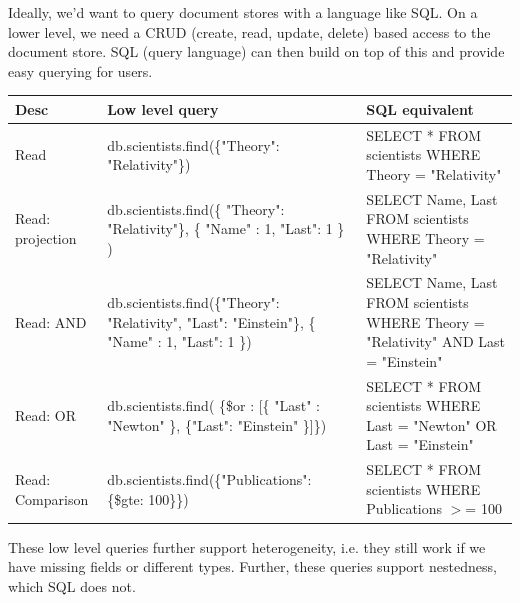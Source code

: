 \documentclass[11pt,oneside,a4paper]{article}
\begin{document}
Ideally, we'd want to query document stores with a language like SQL. On a lower level, we need a CRUD (create, read, update, delete) based access to the document store. SQL (query language) can then build on top of this and provide easy querying for users.\\

\begin{table}[hb!]
\centering
\begin{tabular}{|p{20mm}|p{75mm}|p{75mm}|}
	\hline 
	Desc & Low level query & SQL equivalent\\ 
	\hline 
	Read & db.scientists.find(\{"Theory": "Relativity"\}) & SELECT * FROM scientists
	WHERE Theory = "Relativity" \\ 
	\hline 
	Read: projection & db.scientists.find(\{ "Theory": "Relativity"\},
	\{ "Name" : 1, "Last": 1 \}
	) & SELECT Name, Last
	FROM scientists
	WHERE Theory = "Relativity" \\ 
	\hline 
	Read: AND & db.scientists.find(\{"Theory": "Relativity", "Last": "Einstein"\}, \{ "Name" : 1, "Last": 1 \}) & SELECT Name, Last
	FROM scientists
	WHERE Theory = "Relativity"
	AND Last = "Einstein" \\ 
	\hline 
	Read: OR & db.scientists.find(
	\{\$or : [\{ "Last" : "Newton" \},	\{"Last": "Einstein" \}]\}) & SELECT *
	FROM scientists
	WHERE Last = "Newton"
	OR Last = "Einstein" \\ 
	\hline 
	Read: Comparison & db.scientists.find(\{"Publications": \{\$gte: 100\}\}) & SELECT *
	FROM scientists
	WHERE Publications $>$= 100 \\ 
	\hline 
\end{tabular}
\end{table}


These low level queries further support heterogeneity, i.e. they still work if we have missing fields or different types. Further, these queries support nestedness, which SQL does not.
\end{document}
